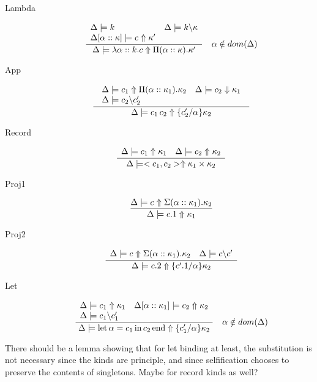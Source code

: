 \documentclass[12pt,twoside,fleqn]{amsart}
\theoremstyle{plain}
\theoremstyle{plain}
\theoremstyle{definition}
\begin{document}
\begin{description}
\item [Lambda]
\[
\frac{\begin{array}{ll}
\Delta  \models k & \Delta  \models k \backslash \kappa \\
\Delta [\alpha ::\kappa ] \models c \Uparrow \kappa ' & 
\end{array} }{\Delta  \models \lambda \alpha  ::k .c \Uparrow \Pi (\alpha ::\kappa ).\kappa ' }\quad \alpha \notin dom(\Delta )\]

\item [App]
\[
\frac{\begin{array}{cc}
\begin{array}{ll}
\Delta  \models c_{1} \Uparrow \Pi (\alpha ::\kappa _{1}).\kappa _{2} & \Delta  \models c_{2} \Downarrow \kappa _{1}\\
\Delta  \models c_{2} \backslash c_{2}' & 
\end{array}
\end{array} }{\Delta  \models c_{1}\, c_{2} \Uparrow \{c_{2}' /\alpha  \}\kappa _{2} }\]

\item [Record]
\[
\frac{\begin{array}{ll}
\Delta  \models c_{1} \Uparrow \kappa _{1} & \Delta  \models c_{2} \Uparrow \kappa _{2}
\end{array} }{\Delta  \models <c_{1},c_{2}> \Uparrow \kappa _{1}\times \kappa _{2} }\]

\item [Proj1]
\[
\frac{\Delta  \models c \Uparrow \Sigma (\alpha ::\kappa _{1}).\kappa _{2} }{\Delta  \models c.1 \Uparrow \kappa _{1} }\]

\item [Proj2]
\[
\frac{\begin{array}{ll}
\Delta  \models c \Uparrow \Sigma (\alpha ::\kappa _{1}).\kappa _{2} & \Delta  \models c \backslash c'
\end{array} }{\Delta  \models c.2 \Uparrow \{c'.1 /\alpha  \}\kappa _{2} }\]

\item [Let]
\[
\frac{\begin{array}{ll}
\Delta  \models c_{1} \Uparrow \kappa _{1} & \Delta [\alpha ::\kappa _{1}] \models c_{2} \Uparrow \kappa _{2}\\
\Delta  \models c_{1} \backslash c_{1}' & 
\end{array} }{\Delta  \models \mathrm{let}\, \alpha  =c_{1} \, \mathrm{in}\, c_{2} \, \mathrm{end} \Uparrow \{c_{1}' /\alpha  \}\kappa _{2} }\quad \alpha \notin dom(\Delta )\]

\end{description}
There should be a lemma showing that for let binding at least, the substitution
is not necessary since the kinds are principle, and since selfification chooses
to preserve the contents of singletons. Maybe for record kinds as well?
\end{document}
